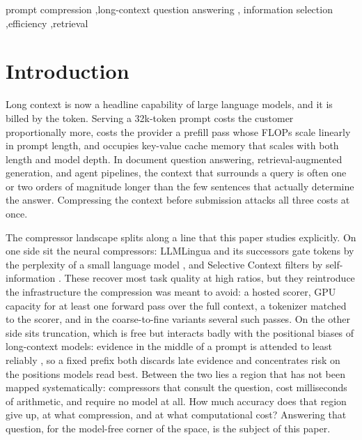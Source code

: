 \documentclass[review,12pt]{elsarticle}
\theoremstyle{remark}
\begin{document}
\begin{frontmatter}
\begin{keyword}
prompt compression \sep long-context question answering \sep
information selection \sep efficiency \sep retrieval
\end{keyword}

\end{frontmatter}

\section{Introduction}
\label{sec:intro}

Long context is now a headline capability of large language models, and
it is billed by the token. Serving a 32k-token prompt costs the customer
proportionally more, costs the provider a prefill pass whose FLOPs scale
linearly in prompt length, and occupies key-value cache memory that
scales with both length and model depth. In document question
answering, retrieval-augmented generation, and agent pipelines, the
context that surrounds a query is often one or two orders of magnitude
longer than the few sentences that actually determine the answer.
Compressing the context before submission attacks all three costs at
once.

The compressor landscape splits along a line that this paper studies
explicitly. On one side sit the neural compressors: LLMLingua and its
successors gate tokens by the perplexity of a small language model
\citep{jiang2023llmlingua,jiang2023longllmlingua,pan2024llmlingua2},
and Selective Context filters by self-information
\citep{li2023selective}. These recover most task quality at high
ratios, but they reintroduce the infrastructure the compression was
meant to avoid: a hosted scorer, GPU capacity for at least one forward
pass over the full context, a tokenizer matched to the scorer, and in
the coarse-to-fine variants several such passes. On the other side sits
truncation, which is free but interacts badly with the positional
biases of long-context models: evidence in the middle of a prompt is
attended to least reliably \citep{liu2023lost}, so a fixed prefix both
discards late evidence and concentrates risk on the positions models
read best. Between the two lies a region that has not been mapped
systematically: compressors that consult the question, cost
milliseconds of arithmetic, and require no model at all. How much
accuracy does that region give up, at what compression, and at what
computational cost? Answering that question, for the model-free corner
of the space, is the subject of this paper.
\end{document}
